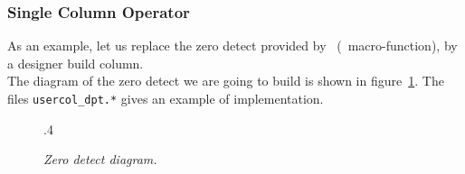      \subsubsection{Single Column Operator}
     \begin{minipage}[t]{\textwidth}
       \forceindent
         As an example, let us replace the zero detect provided by \fpgen\ 
       (\DPNUL\ macro-function), by a designer build column.\\
       \forceindent
         The diagram of the zero detect we are going to build is shown in
       figure~\ref{usercolschema}. The files {\tt usercol\_dpt.*} gives
       an example of implementation.
     \end{minipage}
     \begin{figure}[H]
       \begin{center}
         \leavevmode\epsfxsize.4\textwidth{}
       \end{center}
       \nopagebreak
       \caption{
         \label{usercolschema}
         {\it Zero detect diagram.}}
     \end{figure}
